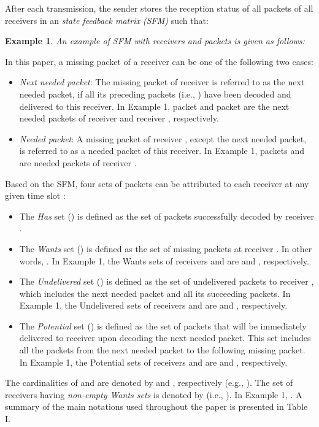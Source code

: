 \documentclass[12pt, peerreview, onecolumn]{IEEEtran}
\begin{document}
After each transmission,  the sender stores the reception  status of all packets of all receivers in an   \emph{state feedback matrix (SFM)}   such that:
 

\newtheorem{examples}{\textbf{Example}}
\begin{examples}
An example of SFM with  receivers and  packets is given as follows:

\end{examples}

In this paper, a missing packet of a receiver can be one of the following two cases:
\begin{itemize}
\item \emph{Next needed packet}: The missing packet   of receiver   is referred to as the next needed packet, if all its preceding packets  (i.e., ) have been decoded and delivered to this receiver. In Example 1, packet  and  packet  are  the next needed packets of receiver  and receiver , respectively.
\item \emph{Needed packet}: A missing packet of receiver , except the next needed packet, is referred to  as a needed packet of this receiver. In Example 1, packets  and  are needed packets of receiver  .
\end{itemize}

Based on the SFM, four sets of packets can be attributed to each receiver  at any given time slot :
\begin{itemize}
\item The \emph{Has} set () is defined as the set of packets successfully decoded by receiver .
\item The \emph{Wants} set () is defined as the set of  missing packets at receiver . In other words, . In Example 1, the Wants sets of receivers  and  are  and , respectively.
\item The \emph{Undelivered} set () is defined as  the set of undelivered packets to receiver , which includes  the next needed packet  and all its succeeding packets. In Example 1, the Undelivered sets of receivers  and  are  and , respectively.
\item The \emph{Potential} set ()  is defined as the set of  packets that will be immediately delivered to  receiver  upon  decoding  the next needed packet. This set includes all the  packets from the next needed packet   to the following missing  packet.  In Example 1, the Potential sets of receivers  and  are  and , respectively.
\end{itemize}
The cardinalities of  and  are denoted  by  and , respectively  (e.g., ).  The set of receivers having \emph{non-empty Wants sets} is denoted by  (i.e., ). In Example 1,  .  A summary of the main notations used throughout the paper is presented  in Table I.
\end{document}
